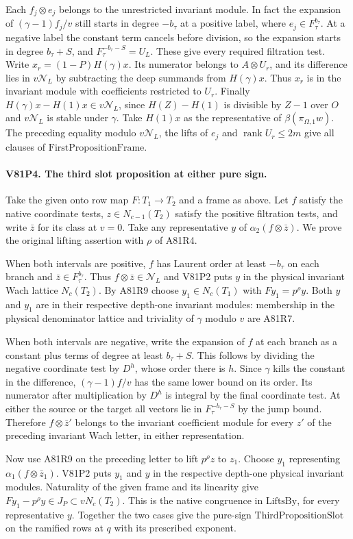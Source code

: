 Each $f_j\otimes e_j$ belongs to the unrestricted invariant module.
In fact the expansion of $(\gamma-1)f_j/v$ still starts in degree
$-b_\tau$ at a positive label, where $e_j\in F_\tau^{b_\tau}$.
At a negative label the constant term cancels before division, so
the expansion starts in degree $b_\tau+S$, and
$F_\tau^{-b_\tau-S}=U_L$. These give every required filtration
test. Write $x_r=(1-P)H(\gamma)x$. Its numerator belongs to
$A\otimes U_r$, and its difference lies in $v\mathcal N_L$ by
subtracting the deep summands from $H(\gamma)x$. Thus $x_r$ is
in the invariant module with coefficients restricted to $U_r$.
Finally $H(\gamma)x-H(1)x\in v\mathcal N_L$, since
$H(Z)-H(1)$ is divisible by $Z-1$ over $O$ and $v\mathcal N_L$
is stable under $\gamma$. Take $H(1)x$ as the representative
of $\beta(\pi_{\Omega,1}w)$. The preceding equality modulo
$v\mathcal N_L$, the lifts of $e_j$ and $\operatorname{rank}U_r
\le 2m$ give all clauses of $\mathrm{FirstPropositionFrame}$.

\paragraph{V81P4. The third slot proposition at either pure sign.}
Take the given onto row map $F:T_1\to T_2$ and a frame as above.
Let $f$ satisfy the native coordinate tests, $z\in N_{c-1}(T_2)$
satisfy the positive filtration tests, and write $\bar z$ for its
class at $v=0$. Take any representative $y$ of
$\alpha_2(f\otimes\bar z)$. We prove the original lifting
assertion with $\rho$ of A81R4.

When both intervals are positive, $f$ has Laurent order at least
$-b_\tau$ on each branch and $\bar z\in F_\tau^{b_\tau}$.
Thus $f\otimes\bar z\in\mathcal N_L$ and V81P2 puts $y$ in the
physical invariant Wach lattice $N_c(T_2)$.
By A81R9 choose $y_1\in N_c(T_1)$ with $Fy_1=p^\rho y$.
Both $y$ and $y_1$ are in their respective depth-one invariant
modules: membership in the physical denominator lattice and
triviality of $\gamma$ modulo $v$ are A81R7.

When both intervals are negative, write the expansion of $f$ at
each branch as a constant plus terms of degree at least $b_\tau+S$.
This follows by dividing the negative coordinate test by $D^h$,
whose order there is $h$. Since $\gamma$ kills the constant in
the difference, $(\gamma-1)f/v$ has the same lower bound on its
order. Its numerator after multiplication by $D^h$ is integral
by the final coordinate test. At either the source or the target
all vectors lie in $F_\tau^{-b_\tau-S}$ by the jump bound.
Therefore $f\otimes\bar z'$ belongs to the invariant coefficient
module for every $z'$ of the preceding invariant Wach letter,
in either representation.

Now use A81R9 on the preceding letter to lift $p^\rho z$ to
$z_1$. Choose $y_1$ representing $\alpha_1(f\otimes\bar z_1)$.
V81P2 puts $y_1$ and $y$ in the respective depth-one physical
invariant modules. Naturality of the given frame and its linearity
give $F y_1-p^\rho y\in J_P\subset vN_c(T_2)$.
This is the native congruence in $\mathrm{LiftsBy}$, for every
representative $y$. Together the two cases give the pure-sign
$\mathrm{ThirdPropositionSlot}$ on the ramified rows at $q$ with
its prescribed exponent.
